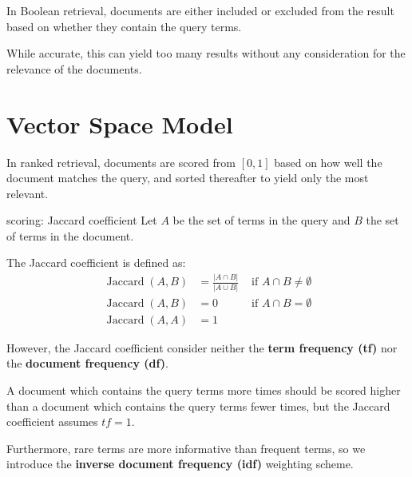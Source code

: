 In Boolean retrieval, documents are either included or excluded from the result based on whether they contain the query terms.

While accurate, this can yield too many results without any consideration for the relevance of the documents.

\section{Vector Space Model}
In ranked retrieval, documents are scored from $[0, 1]$ based on how well the document matches the query, and sorted thereafter to yield only the most relevant.

\begin{defn}{scoring: Jaccard coefficient}
    Let $A$ be the set of terms in the query and $B$ the set of terms in the document.

    The Jaccard coefficient is defined as:\vspace{0.8em}
    \begin{align*}
        \operatorname{Jaccard}(A, B)  & = \frac{|A \cap B|}{|A \cup B|} & \text{ if } A \cap B \neq \emptyset \\
        \operatorname*{Jaccard}(A, B) & = 0                             & \text{ if } A \cap B = \emptyset    \\
        \operatorname*{Jaccard}(A, A) & = 1
    \end{align*}
\end{defn}

However, the Jaccard coefficient consider neither the \textbf{term frequency (tf)} nor the \textbf{document frequency (df)}.

A document which contains the query terms more times should be scored higher than a document which contains the query terms fewer times, but the Jaccard coefficient assumes $tf = 1$.

Furthermore, rare terms are more informative than frequent terms, so we introduce the \textbf{inverse document frequency (idf)} weighting scheme.

